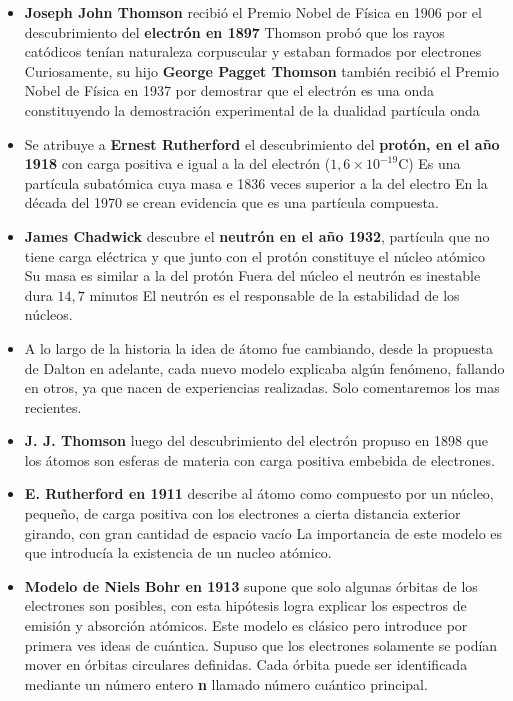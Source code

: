 \begin{itemize}
\item \textbf{Joseph John Thomson} recibió el Premio Nobel de Física en 1906 por el descubrimiento del \textbf{electrón en 1897} Thomson probó que los rayos catódicos tenían naturaleza corpuscular y estaban formados por electrones Curiosamente, su hijo \textbf{George Pagget Thomson} también recibió el Premio Nobel de Física en 1937 por demostrar que el electrón es una onda constituyendo la demostración experimental de la dualidad partícula onda

\item Se atribuye a \textbf{Ernest Rutherford} el descubrimiento del \textbf{protón, en el año 1918} con carga positiva e igual a la del electrón ($1,6\times 10^{-19}$C) Es una partícula subatómica cuya masa e 1836 veces superior a la del electro En la década del 1970 se crean evidencia que es una partícula compuesta.

\item \textbf{James Chadwick} descubre el \textbf{neutrón en el año 1932}, partícula que no tiene carga eléctrica y que junto con el protón constituye el núcleo atómico Su masa es similar a la del protón Fuera del núcleo el neutrón es inestable dura $14,7$ minutos El neutrón es el responsable de la estabilidad de los núcleos.

\item A lo largo de la historia la idea de átomo fue cambiando, desde la propuesta de Dalton en adelante, cada nuevo modelo explicaba algún fenómeno, fallando en otros, ya que nacen de experiencias realizadas. Solo comentaremos los mas recientes.

\item \textbf{J. J. Thomson} luego del descubrimiento del electrón propuso en 1898 que los átomos son esferas de materia con carga positiva embebida de electrones.

\item \textbf{E. Rutherford en 1911} describe al átomo como compuesto por un núcleo, pequeño, de carga positiva con los electrones a cierta distancia exterior
girando, con gran cantidad de espacio vacío La importancia de este modelo es que introducía la existencia de un nucleo atómico.

\item \textbf{Modelo de Niels Bohr en 1913} supone que solo algunas órbitas de los electrones son posibles, con esta hipótesis logra explicar los espectros de emisión y absorción atómicos. Este modelo es clásico pero introduce por primera ves ideas de cuántica. Supuso que los electrones solamente se podían mover en órbitas circulares definidas. Cada órbita puede ser identificada mediante un número entero \textbf{n} llamado número cuántico principal.


\end{itemize}
